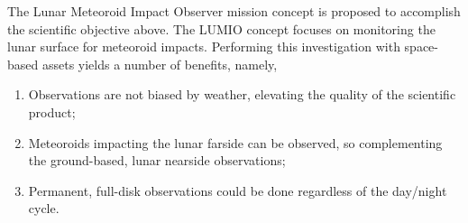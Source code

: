 The Lunar Meteoroid Impact Observer mission concept is proposed to accomplish the scientific objective above. The LUMIO concept focuses on monitoring the lunar surface for meteoroid impacts. Performing this investigation with space-based assets yields a number of benefits, namely,
%
\begin{enumerate}
	\item Observations are not biased by weather, elevating the quality of the scientific product;
	\item Meteoroids impacting the lunar farside can be observed, so complementing the ground-based, lunar nearside observations;
	\item Permanent, full-disk observations could be done regardless of the day/night cycle.
\end{enumerate}
%

